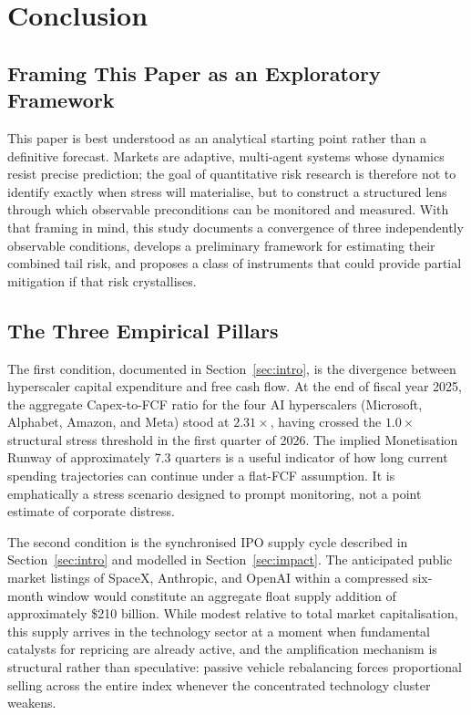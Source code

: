 
\section{Conclusion}
\label{sec:conclusion}

\subsection{Framing This Paper as an Exploratory Framework}

This paper is best understood as an analytical starting point rather than a
definitive forecast. Markets are adaptive, multi-agent systems whose dynamics
resist precise prediction; the goal of quantitative risk research is therefore
not to identify exactly when stress will materialise, but to construct a structured
lens through which observable preconditions can be monitored and measured. With
that framing in mind, this study documents a convergence of three independently
observable conditions, develops a preliminary framework for estimating their
combined tail risk, and proposes a class of instruments that could provide
partial mitigation if that risk crystallises.

\subsection{The Three Empirical Pillars}

The first condition, documented in Section~\ref{sec:intro}, is the divergence
between hyperscaler capital expenditure and free cash flow. At the end of fiscal
year 2025, the aggregate Capex-to-FCF ratio for the four AI hyperscalers
(Microsoft, Alphabet, Amazon, and Meta) stood at $2.31\times$, having crossed
the $1.0\times$ structural stress threshold in the first quarter of 2026.
The implied Monetisation Runway of approximately 7.3 quarters is a useful
indicator of how long current spending trajectories can continue under a
flat-FCF assumption. It is emphatically a stress scenario designed to
prompt monitoring, not a point estimate of corporate distress.

The second condition is the synchronised IPO supply cycle described in
Section~\ref{sec:intro} and modelled in Section~\ref{sec:impact}. The anticipated
public market listings of SpaceX, Anthropic, and OpenAI within a compressed
six-month window would constitute an aggregate float supply addition of
approximately \$210 billion. While modest relative to total market capitalisation,
this supply arrives in the technology sector at a moment when fundamental catalysts
for repricing are already active, and the amplification mechanism is structural
rather than speculative: passive vehicle rebalancing forces proportional selling
across the entire index whenever the concentrated technology cluster weakens.

